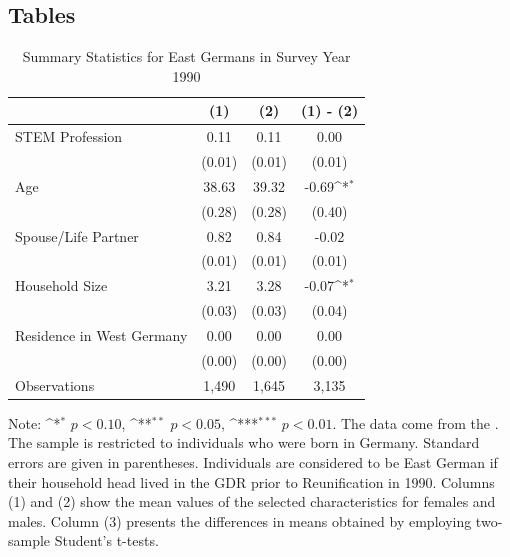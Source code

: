 \documentclass[a4paper, oneside, hyperfootnotes = false]{article}
\def\sym#1{\ifmmode^{#1}\else\(^{#1}\)\fi}
\begin{document}
{
{}
\subsection*{Tables}
\label{tables}

\begin{table}[ht]
	\caption{Summary Statistics for East Germans in Survey Year 1990}
	\label{tab:descr_summary_east}
	\begin{center}
		\begin{tabular}{l*{3}{c}}
			\toprule
			& (1) & (2) & (1) - (2) \\
			\midrule
			STEM Profession & 0.11  & 0.11  &   0.00     \\
			&   (0.01)  & (0.01) & (0.01) \\
			\addlinespace
			Age         &   38.63   &  39.32  &  -0.69\sym{*}     \\
			&     (0.28) &        (0.28)         &      (0.40) \\
			\addlinespace
			Spouse/Life Partner &  0.82      &  0.84  &    -0.02    \\
			&      (0.01)&          (0.01)&         (0.01) \\
			\addlinespace
			Household Size      &  3.21   &  3.28   &   -0.07\sym{*}       \\
			&          (0.03)&       (0.03)        &      (0.04)\\
			\addlinespace
			Residence in West Germany&  0.00   &   0.00  &  0.00         \\
			&         (0.00) &       (0.00)&  (0.00)\\
			\midrule
			Observations        &  1,490    &    1,645     &      3,135             \\
			\bottomrule
		\end{tabular}
		
		\vspace{2mm}
		
		\parbox{10cm}{
			\linespread{1}\footnotesize Note: \sym{*} \(p<0.10\), \sym{**} \(p<0.05\), \sym{***} \(p<0.01\). The data come from the \cite{SOEP2023}. The sample is restricted to individuals who were born in Germany. Standard errors are given in parentheses. Individuals are considered to be East German if their household head lived in the GDR prior to Reunification in 1990. Columns (1) and (2) show the mean values of the selected characteristics for females and males. Column (3) presents the differences in means obtained by employing two-sample Student's t-tests.}
		

\end{center}
\end{table}}
\end{document}
